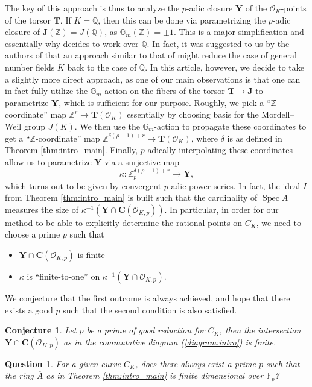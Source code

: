 \documentclass[11pt,oneside]{amsart}
\theoremstyle{plain}
\newtheorem{mainconj}[mainthm]{Conjecture}
\newtheorem{mainqz}[mainthm]{Question}
\theoremstyle{definition}
\DeclareMathOperator{\Gm}{\mathbb{G}_m}
\DeclareMathOperator{\spec}{Spec} \DeclareMathOperator{\sgn}{sign}
\def\TT{\mathbf{T}}
\def\Z{\mathbb{Z}}
\def\F{\mathbb{F}}
\def\Q{\mathbb{Q}}
\def\J{\mathbf{J}}
\def\CC{\mathbf{C}}
\def\ra{\rightarrow}
\def\Gm{{\mathbb{G}_m}}
\def\Y{\mathbf{Y}}
\def\oh{\mathcal{O}}
\begin{document}
The key of this approach is thus to analyze the $p$-adic closure $\Y$ of the $\oh_K$-points of the torsor $\TT$. If $K = \Q$, then this can be done via parametrizing the $p$-adic closure of $\J(\Z) = J (\Q)$, as $\Gm (\Z) = \pm 1$. This is a major simplification and essentially why \cite{EL19} decides to work over $\Q$. In fact, it was suggested to us by the authors of \cite{EL19} that an approach similar to that of \cite{siksek} might reduce the case of general number fields $K$ back to the case of $\Q$. In this article, however, we decide to take a slightly more direct approach, as one of our main observations is that one can in fact fully utilize the $\Gm$-action on the fibers of the torsor $\TT \rightarrow \J$ to parametrize $\Y$, which is sufficient for our purpose. Roughly, we pick a ``$\Z$-coordinate'' map $\Z^{r} \ra \TT(\oh_K)$ essentially by choosing basis for the Mordell--Weil group $J(K)$. We then use the $\Gm$-action to propagate these coordinates to get a  ``$\Z$-coordinate'' map $\Z^{\delta(\rho - 1) + r} \ra \TT(\oh_K)$, where $\delta$ is as defined in Theorem \ref{thm:intro_main}. Finally, $p$-adically interpolating these coordinates allow us to parametrize $\Y$ via a surjective map $$\kappa: \Z_p^{\delta (\rho - 1)+r} \longrightarrow \Y, $$ 
which turns out to be given by convergent $p$-adic power series. In fact, the ideal $I$ from Theorem \ref{thm:intro_main} is built such that the cardinality of  $\spec \overline{A}$ measures the size of $\kappa^{-1} (\Y \cap \CC(\oh_{K, p}))$. In particular, in order for our method to be able to explicitly determine the rational points on $C_K$, we need to choose a prime $p$ such that  
\begin{itemize} 
\item $\Y \cap \CC (\oh_{K, p})$ is finite
\item $\kappa$ is ``finite-to-one'' on $\kappa^{-1} (\Y \cap \oh_{K, p})$. 
\end{itemize}
We conjecture that the first outcome is always achieved, and hope that there exists a good $p$ such that the second condition is also satisfied. 

\begin{mainconj}
Let $p$ be a prime of good reduction for $C_K$, then the intersection $\Y \cap \CC(\oh_{K, p})$ as in the commutative diagram (\ref{diagram:intro}) is finite. 
\end{mainconj} 

\begin{mainqz} \label{question:intro}
For a given curve $C_K$, does there always exist a prime $p$ such that the ring $\overline A$ as in Theorem \ref{thm:intro_main} is finite dimensional over $\F_p$?
\end{mainqz}
\end{document}
